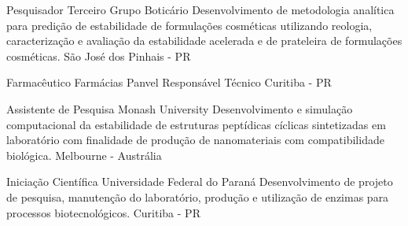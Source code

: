 {Pesquisador Terceiro}
{Grupo Boticário}
{
Desenvolvimento de metodologia analítica para predição de estabilidade
de formulações cosméticas utilizando reologia,
caracterização e avaliação da estabilidade acelerada e de prateleira
de formulações cosméticas.
}
{São José dos Pinhais - PR}

{Farmacêutico}
{Farmácias Panvel}
{Responsável Técnico}
{Curitiba - PR}

{Assistente de Pesquisa}
{Monash University}
{
Desenvolvimento e simulação computacional da estabilidade 
de estruturas peptídicas cíclicas sintetizadas em laboratório 
com finalidade de produção de nanomateriais com compatibilidade biológica.
}
{Melbourne - Austrália}

{Iniciação Científica}
{Universidade Federal do Paraná}
{
Desenvolvimento de projeto de pesquisa, 
manutenção do laboratório, 
produção e utilização de enzimas para processos biotecnológicos.
}
{Curitiba - PR}